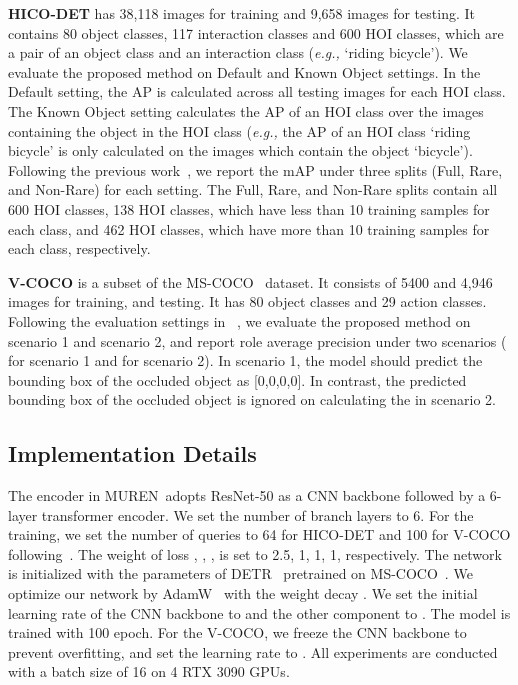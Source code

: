 \documentclass[10pt,twocolumn,letterpaper]{article}
\begin{document}
\noindent
\textbf{HICO-DET} has 38,118 images for training and 9,658 images for testing.
It contains 80 object classes, 117 interaction classes and 600 HOI classes, which are a pair of an object class and an interaction class (\textit{e.g.,} `riding bicycle'). 
We evaluate the proposed method on Default and Known Object settings.
In the Default setting, the AP is calculated across all testing images for each HOI class.
The Known Object setting calculates the AP of an HOI class over the images containing the object in the HOI class (\textit{e.g.,} the AP of an HOI class `riding bicycle' is only calculated on the images which contain the object `bicycle').
Following the previous work~\cite{zhang2021cdn}, we report the mAP under three splits (Full, Rare, and Non-Rare) for each setting.
The Full, Rare, and Non-Rare splits contain all 600 HOI classes, 138 HOI classes, which have less than 10 training samples for each class, and 462 HOI classes, which have more than 10 training samples for each class, respectively.

\noindent
\textbf{V-COCO} is a subset of the MS-COCO~\cite{coco} dataset. It consists of 5400 and 4,946 images for training, and testing.
It has 80 object classes and 29 action classes. 
Following the evaluation settings in ~\cite{kim2021hotr}, we evaluate the proposed method on scenario 1 and scenario 2, and report role average precision under two scenarios ( for scenario 1 and  for scenario 2).
In scenario 1, the model should predict the bounding box of the occluded object as [0,0,0,0].
In contrast, the predicted bounding box of the occluded object is ignored on calculating the  in scenario 2.




\vspace{-1mm}
\subsection{Implementation Details}
The encoder in MUREN~adopts ResNet-50 as a CNN backbone followed by a 6-layer transformer encoder.
We set the number of branch layers  to 6.
For the training, we set the number of queries  to 64 for HICO-DET and 100 for V-COCO following~\cite{zhang2021cdn}.
The weight of loss , , ,  is set to 2.5, 1, 1, 1, respectively.
The network is initialized with the parameters of DETR~\cite{detr} pretrained on MS-COCO~\cite{coco}.
We optimize our network by AdamW~\cite{loshchilov2017decoupled} with the weight decay . 
We set the initial learning rate of the CNN backbone to  and the other component to . The model is trained with 100 epoch.
For the V-COCO, we freeze the CNN backbone to prevent overfitting, and set the learning rate to . All experiments are conducted with a batch size of 16 on 4 RTX 3090 GPUs.
\end{document}
